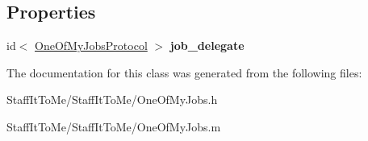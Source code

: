 \subsection*{\-Properties}
\begin{DoxyCompactItemize}
\item 
\hypertarget{interface_one_of_my_jobs_a09b9607acdbf6c14c3ce6b968d25d594}{
id$<$ \hyperlink{protocol_one_of_my_jobs_protocol-p}{\-One\-Of\-My\-Jobs\-Protocol} $>$ {\bfseries job\-\_\-delegate}}
\label{interface_one_of_my_jobs_a09b9607acdbf6c14c3ce6b968d25d594}

\end{DoxyCompactItemize}


\-The documentation for this class was generated from the following files\-:\begin{DoxyCompactItemize}
\item 
\-Staff\-It\-To\-Me/\-Staff\-It\-To\-Me/\-One\-Of\-My\-Jobs.\-h\item 
\-Staff\-It\-To\-Me/\-Staff\-It\-To\-Me/\-One\-Of\-My\-Jobs.\-m\end{DoxyCompactItemize}
